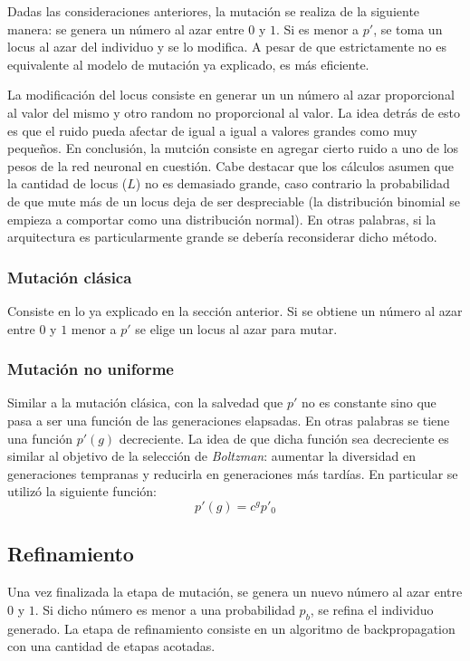 \documentclass[%
    final,
    reprint,
    notitlepage,
    narroweqnarray,
    inline,
    twoside,
    invited
    ]{ieee}
\begin{document}
\par Dadas las consideraciones anteriores, la mutación se realiza de la siguiente manera: 
se genera un número al azar entre $0$ y $1$. Si es menor a $p'$, se toma un locus al azar del individuo y se 
lo modifica. A pesar de que 
estrictamente no es equivalente al modelo de mutación ya explicado, es más eficiente. 
\par La modificación del locus consiste en generar un  
un número al azar proporcional al valor del mismo y otro random no proporcional al valor. La 
idea detrás de esto es que el ruido pueda afectar de igual a igual a valores grandes como muy pequeños. 
En conclusión, la mutción consiste en agregar cierto ruido a uno de los pesos de la red neuronal en cuestión. Cabe 
destacar que los cálculos asumen que la cantidad de locus ($L$) no es demasiado grande, caso contrario la probabilidad 
de que mute más de un locus deja de ser despreciable (la distribución binomial se empieza a comportar 
como una distribución normal). En otras palabras, si la arquitectura es particularmente grande 
se debería reconsiderar dicho método.

\subsubsection{Mutación clásica}

Consiste en lo ya explicado en la sección anterior. Si se obtiene un número al azar entre $0$ y $1$ menor a 
$p'$ se elige un locus al azar para mutar.

\subsubsection{Mutación no uniforme}

Similar a la mutación clásica, con la salvedad que $p'$ no es constante sino que pasa a ser una función 
de las generaciones elapsadas. En otras palabras se tiene una función $p'(g)$ decreciente. La idea de que 
dicha función sea decreciente es similar al objetivo de la selección de \textit{Boltzman}: aumentar la diversidad 
en generaciones tempranas y reducirla en generaciones más tardías. En particular se utilizó la siguiente función:
\[p'(g) = c^{g}p'_0\]

\subsection{Refinamiento}

Una vez finalizada la etapa de mutación, se genera un nuevo número al azar entre $0$ y $1$. Si dicho número 
es menor a una probabilidad $p_b$, se refina el individuo generado. La etapa de refinamiento consiste en 
un algoritmo de backpropagation con una cantidad de etapas acotadas. 
\end{document}
